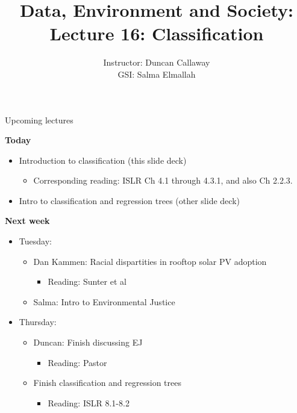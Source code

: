 \documentclass[aspectratio=169]{beamer}
\title[Lecture 16: Intro to Classification] %
{Data, Environment and Society: \\{Lecture 16: Classification}}
\author[ER131: Data, Environment and Society] 
{Instructor: Duncan Callaway\\
GSI: Salma Elmallah}
\institute[UC Berkeley] %
 {\small{ \bf October 24, 2019}}
\date[October 24, 2019]
\begin{document}
\begin{frame}
  \titlepage
\end{frame}

\begin{frame}{Upcoming lectures}

\textbf{Today}
\begin{itemize}
  \item Introduction to classification (this slide deck)
  \begin{itemize}
    \item Corresponding reading:  ISLR Ch 4.1 through 4.3.1, and also Ch 2.2.3.
  \end{itemize}
  \item  Intro to classification and regression trees (other slide deck)
\end{itemize}

\textbf{Next week}
\begin{itemize}
  \item Tuesday: 
  \begin{itemize}
    \item Dan Kammen: Racial dispartities in rooftop solar PV adoption
    \begin{itemize}
      \item Reading: Sunter et al
    \end{itemize}
    \item Salma: Intro to Environmental Justice 
  \end{itemize}
  \item Thursday: 
  \begin{itemize}
    \item Duncan: Finish discussing EJ
    \begin{itemize}
      \item Reading: Pastor
    \end{itemize}
    \item Finish classification and regression trees
    \begin{itemize}
      \item Reading: ISLR 8.1-8.2
    \end{itemize}
  \end{itemize}
\end{itemize}

\end{frame}
\end{document}
